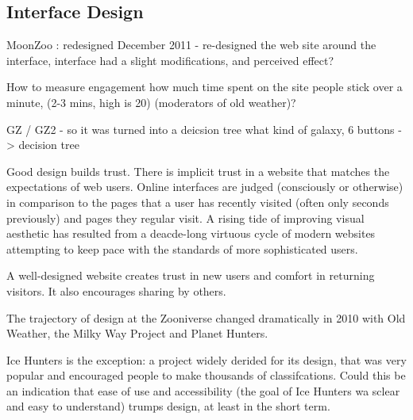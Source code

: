 \documentclass{sigchi}
\begin{document}
\subsection{Interface Design}


MoonZoo : redesigned December 2011 - re-designed the web site around the interface, interface had a slight modifications, and perceived effect? %

How to measure engagement
  how much time spent on the site
  people stick over a minute, (2-3 mins, high is 20)
  (moderators of old weather)?

GZ / GZ2 - so it was turned into a deicsion tree
  what kind of galaxy, 6 buttons -> decision tree



Good design builds trust. There is implicit trust in a website that matches the expectations of web users. Online interfaces are judged (consciously or otherwise) in comparison to the pages that a user has recently visited (often only seconds previously) and pages they regular visit. A rising tide of improving visual aesthetic has resulted from a deacde-long virtuous cycle of modern websites attempting to keep pace with the standards of more sophisticated users.

A well-designed website creates trust in new users and comfort in returning visitors. It also encourages sharing by others.

The trajectory of design at the Zooniverse changed dramatically in 2010 with Old Weather, the Milky Way Project and Planet Hunters. %

Ice Hunters is the exception: a project widely derided for its design, that was very popular and encouraged people to make thousands of classifcations. Could this be an indication that ease of use and accessibility (the goal of Ice Hunters wa sclear and easy to understand) trumps design, at least in the short term.
\end{document}
